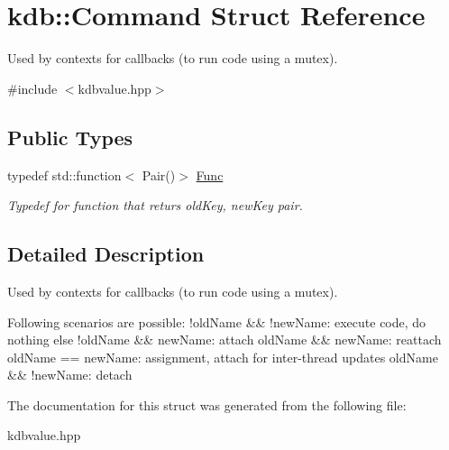 \hypertarget{structkdb_1_1Command}{\section{kdb\+:\+:Command Struct Reference}
\label{structkdb_1_1Command}
}


Used by contexts for callbacks (to run code using a mutex).  




{\ttfamily \#include $<$kdbvalue.\+hpp$>$}

\subsection*{Public Types}
\begin{DoxyCompactItemize}
\item 
\hypertarget{structkdb_1_1Command_a93729918bbcc9dcc678ba303b396d86f}{typedef std\+::function$<$ Pair()$>$ \hyperlink{structkdb_1_1Command_a93729918bbcc9dcc678ba303b396d86f}{Func}}\label{structkdb_1_1Command_a93729918bbcc9dcc678ba303b396d86f}

\begin{DoxyCompactList}\small\item\em Typedef for function that returs old\+Key, new\+Key pair. \end{DoxyCompactList}\end{DoxyCompactItemize}


\subsection{Detailed Description}
Used by contexts for callbacks (to run code using a mutex). 

Following scenarios are possible\+: !old\+Name \&\& !new\+Name\+: execute code, do nothing else !old\+Name \&\& new\+Name\+: attach old\+Name \&\& new\+Name\+: reattach old\+Name == new\+Name\+: assignment, attach for inter-\/thread updates old\+Name \&\& !new\+Name\+: detach 

The documentation for this struct was generated from the following file\+:\begin{DoxyCompactItemize}
\item 
kdbvalue.\+hpp\end{DoxyCompactItemize}
